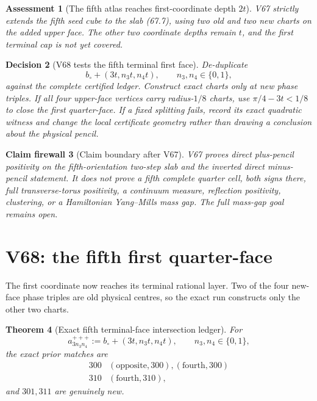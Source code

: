 \documentclass[11pt,oneside]{article}
\newtheorem{theorem}{Theorem}[section]
\newtheorem{assessment}[theorem]{Assessment}
\newtheorem{firewall}[theorem]{Claim firewall}
\newtheorem{decision}[theorem]{Decision}
\theoremstyle{definition}
\theoremstyle{remark}
\begin{document}
\begin{assessment}[The fifth atlas reaches first-coordinate depth \(2t\)]
\label{ass:newv67}
V67 strictly extends the fifth seed cube to the slab (67.7), using
two old and two new charts on the added upper face.  The other two
coordinate depths remain \(t\), and the first terminal cap is not
yet covered.
\end{assessment}

\begin{decision}[V68 tests the fifth terminal first face]
\label{dec:newv67-next}
De-duplicate
\[
 b_\circ+(3t,n_3t,n_4t),\qquad n_3,n_4\in\{0,1\},    \tag{67.13}
\]
against the complete certified ledger.  Construct exact charts only
at new phase triples.  If all four upper-face vertices carry
radius-\(1/8\) charts, use \(\pi/4-3t<1/8\) to close the first
quarter-face.  If a fixed splitting fails, record its exact
quadratic witness and change the local certificate geometry rather
than drawing a conclusion about the physical pencil.
\end{decision}

\begin{firewall}[Claim boundary after V67]
\label{fire:newv67-final}
V67 proves direct plus-pencil positivity on the fifth-orientation
two-step slab and the inverted direct minus-pencil statement.  It
does not prove a fifth complete quarter cell, both signs there, full
transverse-torus positivity, a continuum measure, reflection
positivity, clustering, or a Hamiltonian Yang--Mills mass gap.  The
full mass-gap goal remains open.
\end{firewall}

\section{V68: the fifth first quarter-face}
\label{sec:newv68-fifth-first-plate}

The first coordinate now reaches its terminal rational layer.  Two
of the four new-face phase triples are old physical centres, so the
exact run constructs only the other two charts.

\begin{theorem}[Exact fifth terminal-face intersection ledger]
\label{thm:newv68-intersections}
For
\[
 a_{3n_3n_4}^{+++}:=b_\circ+(3t,n_3t,n_4t),
 \qquad n_3,n_4\in\{0,1\},                            \tag{68.1}
\]
the exact prior matches are
\[
\begin{array}{c|l}
300&(\mathrm{opposite},300),(\mathrm{fourth},300)\\
310&(\mathrm{fourth},310),
\end{array}                                           \tag{68.2}
\]
and \(301,311\) are genuinely new.
\end{theorem}
\end{document}
